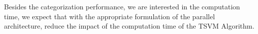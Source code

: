 Besides the categorization performance, we are interested in the computation
time, we expect that with the appropriate formulation of the parallel
architecture, reduce the impact of the computation time of the TSVM
Algorithm.

